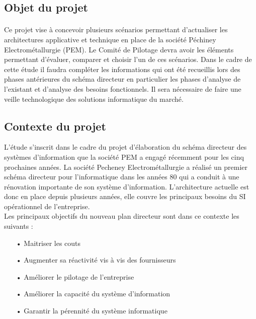 \subsection{Objet du projet}
\paragraph{} Ce projet vise à concevoir plusieurs scénarios permettant d'actualiser les architectures applicative et technique en place de la société Péchiney Electrométallurgie (PEM). Le Comité de Pilotage devra avoir les éléments permettant d'évaluer, comparer et choisir l'un de ces scénarios.
Dans le cadre de cette étude il faudra compléter les informations qui ont été recueillis lors des phases antérieures du schéma directeur en particulier les phases d'analyse de l'existant et d'analyse des besoins fonctionnels. Il sera nécessaire de faire une veille technologique des solutions informatique du marché. 
\subsection{Contexte du projet}
L'étude s'inscrit dans le cadre du projet d'élaboration du schéma directeur des systèmes d'information que la société PEM a engagé récemment pour les cinq prochaines années. La société Pecheney Electrométallurgie a réalisé un premier schéma directeur pour l'informatique dans les années 80 qui a conduit à une rénovation importante de son système d'information. L'architecture actuelle est donc en place depuis plusieurs années, elle couvre les principaux besoins du SI opérationnel de l'entreprise.\\ Les principaux objectifs du nouveau plan directeur sont dans ce contexte les suivants :
\begin{itemize}
\item[•]Maitriser les couts
\item[•]Augmenter sa réactivité vis à vis des fournisseurs
\item[•]Améliorer le pilotage de l'entreprise
\item[•]Améliorer la capacité du système d'information
\item[•]Garantir la pérennité du système informatique
\end{itemize}
